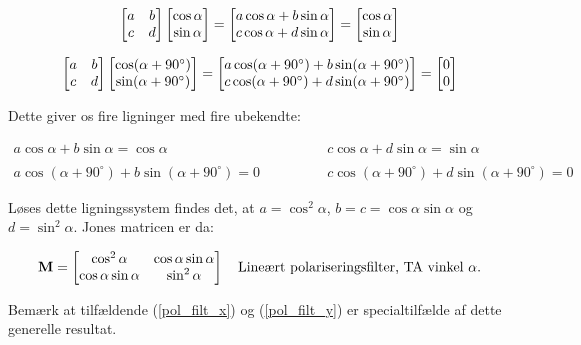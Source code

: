 $$\begin{bmatrix} a & b \\ c & d \\ \end{bmatrix} \begin{bmatrix} \cos \alpha \\ \sin \alpha \end{bmatrix} = \begin{bmatrix} a \cos \alpha + b \sin \alpha \\ c \cos \alpha + d \sin \alpha \end{bmatrix} = \begin{bmatrix} \cos \alpha \\ \sin \alpha \end{bmatrix}$$

\vspace{2mm}

$$\begin{bmatrix} a & b \\ c & d \\ \end{bmatrix} \begin{bmatrix} \cos (\alpha + 90^\circ)  \\ \sin (\alpha + 90^\circ) \end{bmatrix} = \begin{bmatrix} a \cos (\alpha + 90^\circ) + b \sin (\alpha + 90^\circ) \\ c \cos (\alpha + 90^\circ) + d \sin (\alpha + 90^\circ) \end{bmatrix} = \begin{bmatrix} 0 \\ 0 \end{bmatrix}$$

\vspace{2mm}

Dette giver os fire ligninger med fire ubekendte:

\begin{align*}
a \cos \alpha + b \sin \alpha = \cos \alpha \quad \quad & \quad \quad c \cos \alpha + d \sin \alpha = \sin \alpha\\
\\
a \cos (\alpha + 90^\circ) + b \sin (\alpha + 90^\circ) = 0 \quad \quad & \quad \quad c \cos (\alpha + 90^\circ) + d \sin (\alpha + 90^\circ) = 0  
\end{align*}

\vspace{2mm}

Løses dette ligningssystem findes det, at $a = \cos^2 \alpha$, $b = c = \cos \alpha \sin \alpha$ og $d = \sin^2 \alpha$. Jones matricen er da:

\begin{equation}
\mathbf{M} = \begin{bmatrix}
\cos^2 \alpha & \cos \alpha \sin \alpha\\
\cos \alpha \sin \alpha & \sin^2 \alpha \\
\end{bmatrix}
\quad \text{Lineært polariseringsfilter, TA vinkel $\alpha$.}
\end{equation}

\vspace{2mm}

Bemærk at tilfældende (\ref{pol_filt_x}) og (\ref{pol_filt_y}) er specialtilfælde af dette generelle resultat.\\

